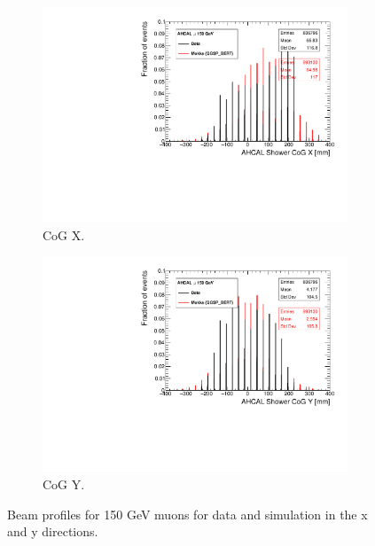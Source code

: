 \begin{figure}[htbp!]
  \centering
  \begin{subfigure}[t]{0.49\textwidth}
    \includegraphics[width=1.\linewidth]{../Thesis_Plots/Timing/Muons/Plots/BeamProfileX.pdf}
    \caption{CoG X.} \label{fig:mu150GeVX}
  \end{subfigure}
  \hfill
  \begin{subfigure}[t]{0.49\textwidth}
    \includegraphics[width=1.\linewidth]{../Thesis_Plots/Timing/Muons/Plots/BeamProfileY.pdf}
    \caption{CoG Y.} \label{fig:mu150GeVY}
  \end{subfigure}
  \caption{Beam profiles for 150 GeV muons for data and simulation in the x and y directions.}
  \label{fig:BPmu}
\end{figure}

